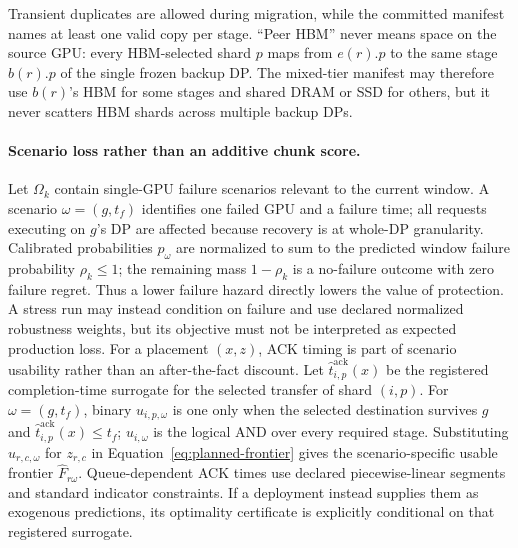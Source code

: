 Transient duplicates are allowed during migration, while the committed
manifest names at least one valid copy per stage.  ``Peer HBM'' never means
space on the source GPU: every HBM-selected shard $p$ maps from $e(r).p$ to the
same stage $b(r).p$ of the single frozen backup DP.  The mixed-tier manifest may
therefore use $b(r)$'s HBM for some stages and shared DRAM or SSD for others,
but it never scatters HBM shards across multiple backup DPs.

\paragraph{Scenario loss rather than an additive chunk score.}
Let $\Omega_k$ contain single-GPU failure scenarios relevant to the current
window.  A scenario $\omega=(g,t_f)$ identifies one failed GPU and a failure
time; all requests executing on $g$'s DP are affected because recovery is at
whole-DP granularity.  Calibrated probabilities $p_\omega$ are normalized to
sum to the predicted window failure probability $\rho_k\le 1$; the remaining
mass $1-\rho_k$ is a no-failure outcome with zero failure regret.  Thus a lower
failure hazard directly lowers the value of protection.  A stress run may
instead condition on failure and use declared normalized robustness weights,
but its objective must not be interpreted as expected production loss.  For a
  placement $(x,z)$, ACK timing is part of scenario usability rather than an
  after-the-fact discount.  Let $\widehat t^{\mathrm{ack}}_{i,p}(x)$ be the
  registered completion-time surrogate for the selected transfer of shard
  $(i,p)$.  For $\omega=(g,t_f)$, binary $u_{i,p,\omega}$ is one only when the
  selected destination survives $g$ and
  $\widehat t^{\mathrm{ack}}_{i,p}(x)\le t_f$; $u_{i,\omega}$ is the logical AND
  over every required stage.  Substituting $u_{r,c,\omega}$ for $z_{r,c}$ in
  Equation~\ref{eq:planned-frontier} gives the scenario-specific usable
  frontier $\widehat F_{r\omega}$.  Queue-dependent ACK times use declared
  piecewise-linear segments and standard indicator constraints.  If a
  deployment instead supplies them as exogenous predictions, its optimality
  certificate is explicitly conditional on that registered surrogate.

